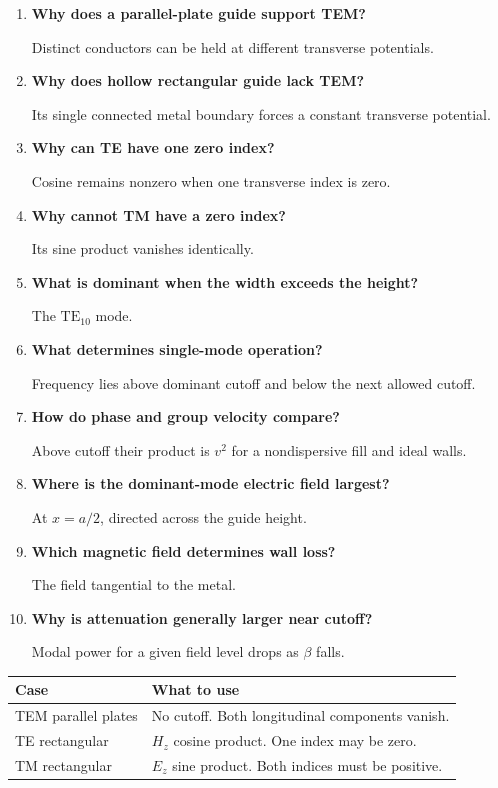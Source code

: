 \documentclass[12pt,a4paper]{article}
\newcommand{\Q}[1]{\textbf{#1}\par\noindent\ignorespaces}
\begin{document}
\begin{tcolorbox}[exambox,title={Frequently Asked / Viva Questions}]
\begin{enumerate}[topsep=0pt, label=\textbf{Q\arabic*.}, itemsep=5pt]
\item \Q{Why does a parallel-plate guide support TEM?}
Distinct conductors can be held at different transverse potentials.
\item \Q{Why does hollow rectangular guide lack TEM?}
Its single connected metal boundary forces a constant transverse potential.
\item \Q{Why can TE have one zero index?}
Cosine remains nonzero when one transverse index is zero.
\item \Q{Why cannot TM have a zero index?}
Its sine product vanishes identically.
\item \Q{What is dominant when the width exceeds the height?}
The $\mathrm{TE}_{10}$ mode.
\item \Q{What determines single-mode operation?}
Frequency lies above dominant cutoff and below the next allowed cutoff.
\item \Q{How do phase and group velocity compare?}
Above cutoff their product is $v^2$ for a nondispersive fill and ideal walls.
\item \Q{Where is the dominant-mode electric field largest?}
At $x=a/2$, directed across the guide height.
\item \Q{Which magnetic field determines wall loss?}
The field tangential to the metal.
\item \Q{Why is attenuation generally larger near cutoff?}
Modal power for a given field level drops as $\beta$ falls.
\end{enumerate}
\end{tcolorbox}
\begin{tcolorbox}[tikzbox,title={Summary comparison}]
\begin{tabularx}{\linewidth}{|B{4cm}|Y|}\hline
\textbf{Case} & \textbf{What to use} \\ \hline
TEM parallel plates & No cutoff. Both longitudinal components vanish. \\ \hline
TE rectangular & $H_z$ cosine product. One index may be zero. \\ \hline
TM rectangular & $E_z$ sine product. Both indices must be positive. \\ \hline
\end{tabularx}
\end{tcolorbox}
\end{document}
